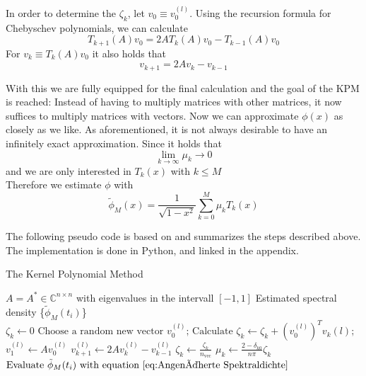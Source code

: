 In order to determine the $\zeta_k$, let $v_0 \equiv v_0^{(l)}$.
Using the recursion formula for Chebyschev polynomials, we can calculate
\[
T_{k + 1}(A)v_0 = 2 A T_k(A) v_0 - T_{k - 1}(A) v_0
\]
For $v_k \equiv T_k(A)v_0$ it also holds that
\[
v_{k + 1} = 2 A v_k - v_{k - 1}
\]

With this we are fully equipped for the final calculation and the goal of the KPM is reached:
Instead of having to multiply matrices with other matrices, it now suffices to multiply matrices with vectors.
Now we can approximate $\phi(x)$ as closely as we like.
As aforementioned, it is not always desirable to have an infinitely exact approximation.
Since it holds that
\[
\lim \limits_{k \to \infty} \mu_k \to 0
\]
and we are only interested in $T_k(x)$ with $k \leq M$\\
Therefore we estimate $\phi$ with
\begin{equation} \label{eq:Angenäherte Spektraldichte}
    \tilde{\phi}_M(x) = \frac{1}{\sqrt{1 - x^2}} \sum_{k = 0}^{M} \mu_k T_k(x)
\end{equation}

The following pseudo code is based on \cite[p.~10]{linsaadyang14} and summarizes the steps described above.
The implementation is done in Python, and linked in the appendix.

\begin{algorithm}
    \caption{The Kernel Polynomial Method}\label{alg:cap}
    \begin{algorithmic}[5]
    \Require $A = A^* \in \mathbb{C}^{n \times n}$ with eigenvalues in the intervall $[-1, 1]$
    \Ensure Estimated spectral density \{$\tilde{\phi}_M(t_i)$\}\\
    \State $\zeta_k \gets 0$
    \EndFor
    \State $\text{Choose a random new vector } v_0^{(l)}\text{;}$ 
    \State $\text{Calculate } \zeta_k \gets \zeta_k + \left( v_0^{(l)} \right)^T v_k{(l)}\text{;}$  
    \State $v_1^{(l)} \gets A v_0^{(l)}$
    \Else
    \State $v_{k+1}^{(l)} \gets 2 A v_k^{(l)} - v_{k-1}^{(l)}$ 
    \EndIf
    \EndFor
    \EndFor
    \State $\zeta_k \gets \frac{\zeta_k}{n_{\text{vec}}}$
    \State $\mu_k \gets \frac{2 - \delta_{k0}}{n \pi} \zeta_k$
    \EndFor
    \State $\text{Evaluate } \tilde{\phi}_M(t_i) \text{ with equation } \ref{eq:Angenäherte Spektraldichte}$
    \end{algorithmic}
\end{algorithm}

